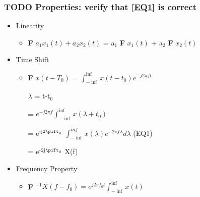\documentclass[11pt]{article}
\begin{document}
\subsubsection{{\bfseries\sffamily TODO} Properties: verify that \ref{EQ1} is correct}
\label{sec-4-4-1}
\begin{itemize}
\item Linearity
\begin{itemize}
\item \textbf{F} ${a_1 x_1(t) + a_2 x_2(t)}$ = a$_{\text{1}}$ \textbf{F} ${x_1(t)}$ + a$_{\text{2}}$ \textbf{F} ${x_2(t)}$
\end{itemize}
\item Time Shift
\begin{itemize}
\item \textbf{F} ${x(t - T_0)}$ = $\int_{-\inf}^{\inf} x(t-t_0) e^{-j2\pi ft}$

$\lambda$ = t-t$_{\text{0}}$

= $e^{-j2\pi f}\int_{-\inf}^{\inf}{x(\lambda +t_0)}$

= e$^{\text{-j2}\pift_{\text{0}}}$ $\int_{-\inf}^{inf} x(\lambda) e^{-2\pi f\lambda} d\lambda$ \label{EQ1} (EQ1)

= e$^{\text{-2j}\pift_{\text{0}}}$ X(f)
\end{itemize}

\item Frequency Property
\begin{itemize}
\item \textbf{F} $^{-1}{X(f-f_0)} = e^{j2\pi f_0t} \int_{-\inf}^{\inf}{x(t)}$
\end{itemize}
\end{itemize}
\end{document}
